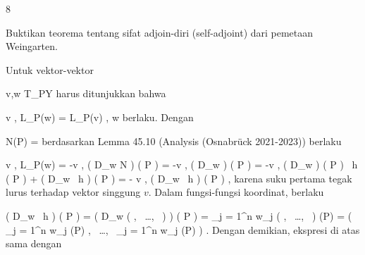 {8}

{

Buktikan teorema tentang sifat adjoin-diri (self-adjoint) dari pemetaan Weingarten.

}
{

Untuk vektor-vektor

\mavergleichskette
{\vergleichskette
{ v,w
}
{ \in }{ T_PY
}
{  }{
}
{    }{
}
{   }{
}
}
{}{}{}
harus ditunjukkan bahwa

\mavergleichskettedisp
{\vergleichskette
{ \left\langle  v  ,  L_P(w)  \right\rangle
}
{ =} { \left\langle L_P(v) ,  w  \right\rangle
}
{ } {
}
{ } {
}
{ } {
}
}
{}{}{}
berlaku. Dengan

\mavergleichskette
{\vergleichskette
{ N(P)
}
{ = }{ {  }
}
{  }{
}
{    }{
}
{   }{
}
}
{}{}{}
berdasarkan
Lemma 45.10 (Analysis (Osnabrück 2021-2023))
berlaku

\mavergleichskettealignhandlinks
{\vergleichskettealignhandlinks
{ \left\langle  v  ,  L_P(w)  \right\rangle
}
{ =} { -\left\langle  v  ,  \left(  D_{w}  N   \right) \left(   P   \right)   \right\rangle
}
{ =} { -\left\langle  v  ,  \left(  D_{w}  {  }   \right) \left(   P   \right)     \right\rangle
}
{ =} { -\left\langle  v  ,  \left(  D_{w}  {  }   \right) \left(   P   \right) \cdot
{} \,  h  (  P ) + {  } \cdot  \left(  D_{w}
 \,  h   \right) \left(   P   \right)   \right\rangle
}
{ =} { - {  } \left\langle  v  ,  \left(  D_{w}
 \,  h   \right) \left(   P   \right)    \right\rangle
}
}
{}
{}{,}
karena suku pertama tegak lurus terhadap vektor singgung $v$. Dalam fungsi-fungsi koordinat, berlaku

\mavergleichskettealignhandlinks
{\vergleichskettealignhandlinks
{ \left(  D_{w}
 \,  h   \right) \left(   P   \right)
}
{ =} { \left(  D_{w}  \left(  {  }   , \,   \ldots  , \,   {  }                 \right)    \right) \left(   P   \right)
}
{ =} { \sum_{j = 1}^n  w_j  {  }  \left(  {  }   , \,   \ldots  , \,   {  }                 \right) (P)
}
{ =} { \left(  \sum_{j = 1}^n  w_j  {  }  {  } (P)   , \,   \ldots  , \,   \sum_{j = 1}^n  w_j  {  }  {  } (P)                 \right)
}
{ } {
}
}
{}
{}{.}
Dengan demikian, ekspresi di atas sama dengan

}
